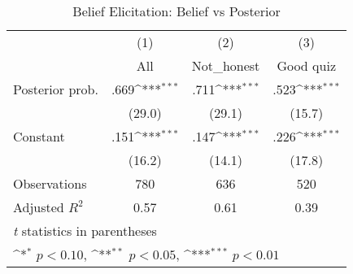 \begin{table}[htbp]\centering
\def\sym#1{\ifmmode^{#1}\else\(^{#1}\)\fi}
\caption{Belief Elicitation: Belief vs Posterior}
\begin{tabular}{l*{3}{c}}
\hline\hline
                &\multicolumn{1}{c}{(1)}&\multicolumn{1}{c}{(2)}&\multicolumn{1}{c}{(3)}\\
                &\multicolumn{1}{c}{All}&\multicolumn{1}{c}{Not\_honest}&\multicolumn{1}{c}{Good quiz}\\
\hline
Posterior prob. &     .669\sym{***}&     .711\sym{***}&     .523\sym{***}\\
                &   (29.0)         &   (29.1)         &   (15.7)         \\
Constant        &     .151\sym{***}&     .147\sym{***}&     .226\sym{***}\\
                &   (16.2)         &   (14.1)         &   (17.8)         \\
\hline
Observations    &      780         &      636         &      520         \\
Adjusted \(R^{2}\)&     0.57         &     0.61         &     0.39         \\
\hline\hline
\multicolumn{4}{l}{\footnotesize \textit{t} statistics in parentheses}\\
\multicolumn{4}{l}{\footnotesize \sym{*} \(p<0.10\), \sym{**} \(p<0.05\), \sym{***} \(p<0.01\)}\\
\end{tabular}
\end{table}
